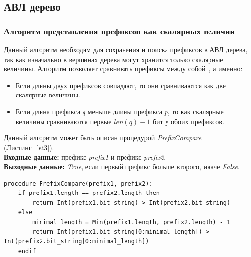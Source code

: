 \documentclass[conference]{IEEEtran}
\begin{document}
        \subsection{АВЛ дерево}
            \subsubsection{Алгоритм представления префиксов как скалярных величин}
                Данный алгоритм необходим для сохранения и поиска префиксов в АВЛ дерева, так как изначально в вершинах дерева могут хранится только скалярные величины.
                Алгоритм позволяет сравнивать префиксы между собой~\cite{behdadfar2011coded}, а именно:
                \begin{itemize}
                    \item Если длины двух префиксов совпадают, то они сравниваются как две скалярные величины.
                    \item Если длина префикса $q$ меньше длины префикса $p$, то как скалярные величины сравниваются первые $len(q) - 1$ бит у обоих префиксов.
                \end{itemize}
                Данный алгоритм может быть описан процедурой \emph{PrefixCompare} (Листинг~\ref{lst3}).\\
                {\bf Входные данные:} префикс \emph{prefix1} и префикс \emph{prefix2}.\\
                {\bf Выходные данные:} \emph{True}, если первый префикс больше второго, иначе \emph{False}.
\\
\begin{lstlisting}[caption=Процедура сравнения префиксов как скалярных величин., label=lst3]
procedure PrefixCompare(prefix1, prefix2):
    if prefix1.length == prefix2.length then
        return Int(prefix1.bit_string) > Int(prefix2.bit_string)
    else
        minimal_length = Min(prefix1.length, prefix2.length) - 1
        return Int(prefix1.bit_string[0:minimal_length]) > Int(prefix2.bit_string[0:minimal_length])
    endif
\end{lstlisting}
\end{document}
